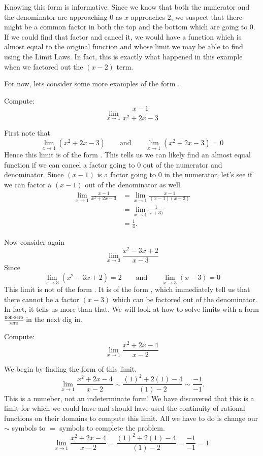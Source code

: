 \documentclass{ximera}
\begin{document}
Knowing this form is informative.  Since we know that both the
numerator and the denominator are approaching $0$ as $x$ approaches
$2$, we suspect that there might be a common factor in both the top
and the bottom which are going to $0$.  If we could find that factor
and cancel it, we would have a function which is almost equal to the
original function and whose limit we may be able to find using the
Limit Laws.  In fact, this is exactly what happened in this example
when we factored out the $(x-2)$ term.

For now, lets consider some more examples of the form \zeroOverZero.

\begin{example}
  Compute:
  \[
  \lim_{x\to1}\frac{x-1}{x^2+2x-3}
  \]
  \begin{explanation}
    First note that
    \[
    \lim_{x\to1}\left(x^2+2x-3\right) \qquad\text{and}\qquad  \lim_{x\to1}\left(x^2+2x-3\right) = 0
    \]
    Hence this limit is of the form \zeroOverZero.  This tells us we
    can likely find an almost equal function if we can cancel a factor
    going to $0$ out of the numerator and denominator.  Since $(x-1)$
    is a factor going to $0$ in the numerator, let's see if we can
    factor a $(x-1)$ out of the denominator as well.
    \begin{align*}
      \lim_{x\to1}\frac{x-1}{x^2+2x-3}&=\lim_{x\to1}\frac{x-1}{(x-1)(x+3)} \\
      &=\lim_{x\to1}\frac{1}{x+3)}\\
      &=\frac{1}{4}.
    \end{align*}
  \end{explanation}
\end{example}

Now consider again
\[
\lim_{x\to 3}\frac{x^2-3x+2}{x-3} 
\]
Since
\[
\lim_{x\to3}\left(x^2-3x+2\right) = 2 \qquad\text{and}\qquad  \lim_{x\to3}\left(x-3\right) = 0
\]
This limit is not of the form \zeroOverZero. It is of the form
\numOverZero, which immediately tell us that there cannot be a factor
$(x-3)$ which can be factored out of the denominator.  In fact, it
tells us more than that.  We will look at how to solve limits with a
form $\frac{\text{non-zero}}{\text{zero}}$ in the next dig in.


\begin{example}
  Compute:
  \[
  \lim_{x\to1}\frac{x^2+2x-4}{x-2}
  \]
\begin{explanation}
  We begin by finding the form of this
  limit.
  \[
  \lim_{x\to1}\frac{x^2+2x-4}{x-2} \sim\frac{(1)^2+2(1)-4}{(1)-2} \sim \frac{-1}{-1}.
  \]
  This is a numeber, not an indeterminate form! We have discovered
  that this is a limit for which we could have and should have used
  the continuity of rational functions on their domains to compute
  this limit.  All we have to do is change our $\sim$ symbols to $=$
  symbols to complete the problem.
  \[
  \lim_{x\to1}\frac{x^2+2x-4}{x-2} = \frac{(1)^2+2(1)-4}{(1)-2} =
  \frac{-1}{-1} =1.
  \]
\end{explanation}
\end{example}
\end{document}
